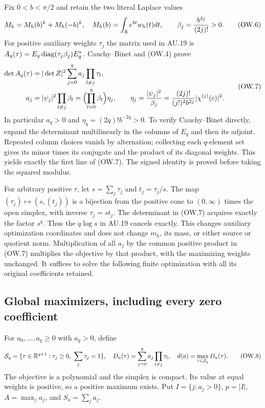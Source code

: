 Fix $0<b<\pi/2$ and retain the two literal Laplace values
\[
 M_k=M_h(b)^k+M_h(-b)^k,\quad M_h(b)=\int_\mathbb R e^{bt}w_h(t)dt,
 \qquad \beta_j=\frac{b^{2j}}{(2j)!}>0.                   \tag{OW.6}
\]
For positive auxiliary weights $\tau_j$ the matrix used in AU.19 is
$A_q(\tau)=E_q\operatorname{diag}(\tau_j\beta_j)E_q^*$.
Cauchy--Binet and (OW.4) prove
\[
 \begin{split}
 \det A_q(\tau)
 &=|\det Z|^2\sum_{j=0}^q a_j\prod_{l\ne j}\tau_l,\\
 a_j&=|\psi_j|^2\prod_{l\ne j}\beta_l
       =\Bigl(\prod_{l=0}^q\beta_l\Bigr)\eta_j,\qquad
 \eta_j=\frac{|\psi_j|^2}{\beta_j}
       =\frac{(2j)!}{(j!)^2b^{2j}}|\chi^{(j)}(c)|^2.
 \end{split}                                               \tag{OW.7}
\]
In particular $a_q>0$ and $\eta_q=(2q)!b^{-2q}>0$.
To verify Cauchy--Binet directly, expand the determinant multilinearly
in the columns of $E_q$ and then its adjoint. Repeated column choices
vanish by alternation; collecting each $q$-element set gives its
minor times its conjugate and the product of its diagonal weights.
This yields exactly the first line of (OW.7). The signed identity is
proved before taking the squared modulus.

For arbitrary positive $\tau$, let $s=\sum_j\tau_j$ and
$t_j=\tau_j/s$. The map $(\tau_j)\mapsto(s,(t_j))$ is a bijection
from the positive cone to $(0,\infty)$ times the open simplex, with
inverse $\tau_j=st_j$. The determinant in (OW.7) acquires exactly
the factor $s^q$. Thus the $q\log s$ in AU.19 cancels exactly.
This changes auxiliary optimization coordinates and does not change
$m_k$, its mass, or either source or quotient norm. Multiplication
of all $a_j$ by the common positive product in (OW.7) multiplies the
objective by that product, with the maximizing weights unchanged.
It suffices to solve the following finite optimization with all its
original coefficients retained.

\subsection{Global maximizers, including every zero coefficient}

For $a_0,\ldots,a_q\ge0$ with $a_q>0$, define
\[
 \mathcal S_q=\{\tau\in\mathbb R^{q+1}:\tau_j\ge0,\ \sum_j\tau_j=1\},
 \quad D_a(\tau)=\sum_{j=0}^qa_j\prod_{l\ne j}\tau_l,
 \quad d(a)=\max_{\tau\in\mathcal S_q}D_a(\tau).          \tag{OW.8}
\]
The objective is a polynomial and the simplex is compact. Its value
at equal weights is positive, so a positive maximum exists. Put
$I=\{j:a_j>0\}$, $p=|I|$, $A=\max_j a_j$, and $S_a=\sum_j a_j$.

